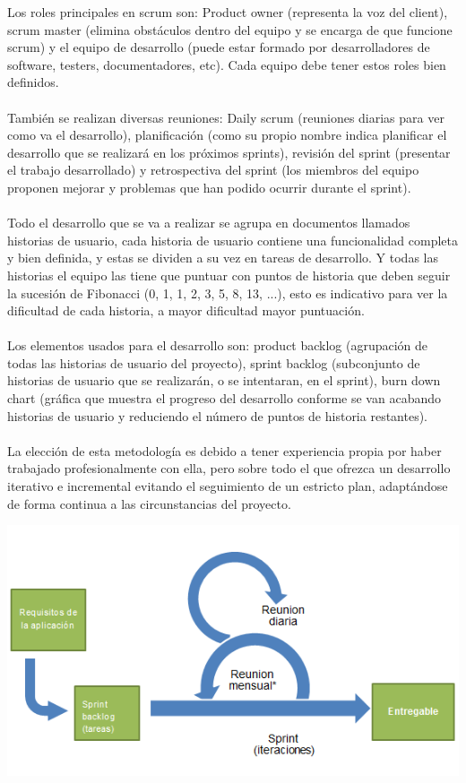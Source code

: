 \documentclass[14pt]{extarticle}
\theoremstyle{definition}
\theoremstyle{remark}
\begin{document}
Los roles principales en scrum son: Product owner (representa la voz del client), scrum master (elimina obstáculos dentro del equipo y se encarga de que funcione scrum) y el equipo de desarrollo (puede estar formado por desarrolladores de software, testers, documentadores, etc). Cada equipo debe tener estos roles bien definidos.\\\\
También se realizan diversas reuniones: Daily scrum (reuniones diarias para ver como va el desarrollo), planificación (como su propio nombre indica planificar el desarrollo que se realizará en los próximos sprints), revisión del sprint (presentar el trabajo desarrollado) y retrospectiva del sprint (los miembros del equipo proponen mejorar y problemas que han podido ocurrir durante el sprint).\\\\
Todo el desarrollo que se va a realizar se agrupa en documentos llamados historias de usuario, cada historia de usuario contiene una funcionalidad completa y bien definida, y estas se dividen a su vez en tareas de desarrollo. Y todas las historias el equipo las tiene que puntuar con puntos de historia que deben seguir la sucesión de Fibonacci \cite{wiki:fibonacci} (0, 1, 1, 2, 3, 5, 8, 13, ...), esto es indicativo para ver la dificultad de cada historia, a mayor dificultad mayor puntuación.\\\\
Los elementos usados para el desarrollo son: product backlog (agrupación de todas las historias de usuario del proyecto), sprint backlog (subconjunto de historias de usuario que se realizarán, o se intentaran, en el sprint), burn down chart (gráfica que muestra el progreso del desarrollo conforme se van acabando historias de usuario y reduciendo el número de puntos de historia restantes).\\\\
La elección de esta metodología es debido a tener experiencia propia por haber trabajado profesionalmente con ella, pero sobre todo el que ofrezca un desarrollo iterativo e incremental evitando el seguimiento de un estricto plan, adaptándose de forma continua a las circunstancias del proyecto.
\begin{center}
\includegraphics{Scrum.png}
\end{center}
\end{document}
